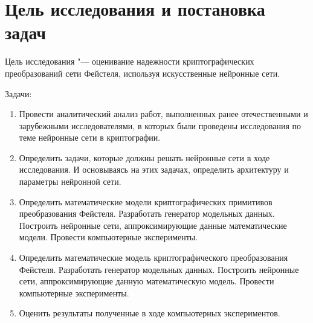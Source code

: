  \chapter*{Цель исследования и постановка задач}
  \label{c:goals}
  
	Цель исследования "--- оценивание надежности криптографических преобразований сети Фейстеля, используя искусственные нейронные сети.

	\bigskip
	
	Задачи:
	\begin{enumerate}
		\item Провести аналитический анализ работ, выполненных ранее отечественными и зарубежными исследователями, в которых были проведены исследования
		по теме нейронные сети в криптографии.
	
		\item Определить задачи, которые должны решать нейронные сети в ходе исследования. И основываясь на этих задачах, определить архитектуру и параметры нейронной сети.
	
		\item Определить математические модели криптографических примитивов преобразования Фейстеля. Разработать генератор модельных данных.
		Построить нейронные сети, аппроксимирующие данные математические модели. Провести компьютерные эксперименты.
	
		\item Определить математические модель криптографического преобразования Фейстеля. Разработать генератор модельных данных.
		Построить нейронные сети, аппроксимирующие данную математическую модель. Провести компьютерные эксперименты.
	
		\item Оценить результаты полученные в ходе компьютерных экспериментов.
	\end{enumerate}

